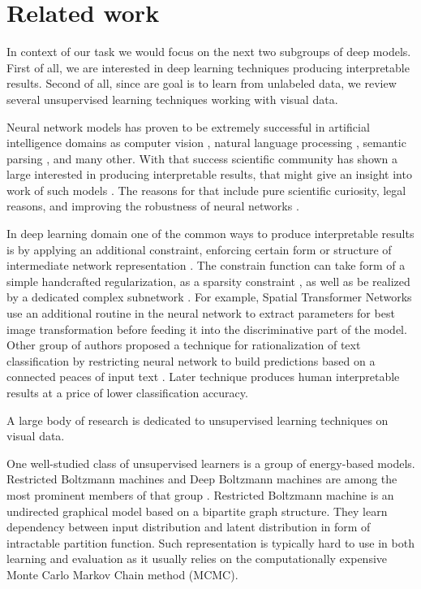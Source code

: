 
\chapter{Related work}\label{ch:rewo}

In context of our task we would focus on the next two subgroups of deep models.
First of all, we are interested in deep learning techniques producing interpretable results.
Second of all, since are goal is to learn from unlabeled data, we review several unsupervised learning techniques working with visual data.

Neural network models has proven to be extremely successful in artificial intelligence domains as computer vision \cite{ILSVRC15}, natural language processing \cite{NIPS2013_5021}, semantic parsing \cite{bordes2012}, and many other.
With that success scientific community has shown a large interested in producing interpretable results, that might give an insight into work of such models \cite{Yosinski2015, Mahendran2014, Zeiler2014, Lei2016}.
The reasons for that include pure scientific curiosity, legal reasons, and improving the robustness of neural networks \cite{Goodfellow2015}.

In deep learning domain one of the common ways to produce interpretable results is by applying an additional constraint, enforcing certain form or structure of intermediate network representation  \cite{Jaderberg2015, Lei2016, Kulkarni2015}.
The constrain function can take form of a simple handcrafted regularization, as a sparsity constraint \cite{Ng2011}, as well as be realized by a dedicated complex subnetwork \cite{Lei2016, Li2015}.
For example, Spatial Transformer Networks \cite{Jaderberg2015} use an additional routine in the neural network to extract parameters for best image transformation before feeding it into the discriminative part of the model.
Other group of authors proposed a technique for rationalization of text classification by restricting neural network to build predictions based on a connected peaces of input text \cite{Lei2016}.
Later technique produces human interpretable results at a price of lower classification accuracy.

A large body of research is dedicated to unsupervised learning techniques on visual data.

One well-studied class of unsupervised learners is a group of energy-based models.
Restricted Boltzmann machines and Deep Boltzmann machines are among the most prominent members of that group \cite{Ackley1985, Salakhutdinov2009}.
Restricted Boltzmann machine is an undirected graphical model based on a bipartite graph structure.
They learn dependency between input distribution and latent distribution in form of intractable partition function.
Such representation is typically hard to use in both learning and evaluation as it usually relies on the computationally expensive Monte Carlo Markov Chain method (MCMC).

